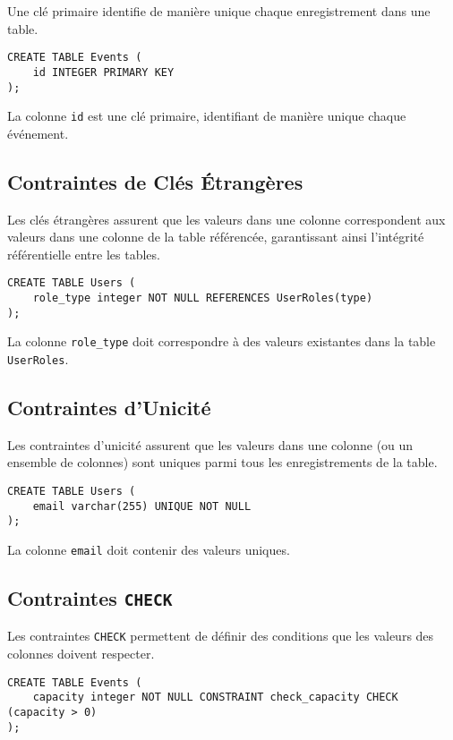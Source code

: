 Une clé primaire identifie de manière unique chaque enregistrement dans une table.

\begin{lstlisting}
CREATE TABLE Events (
    id INTEGER PRIMARY KEY
);
\end{lstlisting}

La colonne \texttt{id} est une clé primaire, identifiant de manière unique chaque événement.

\subsection*{Contraintes de Clés Étrangères}

Les clés étrangères assurent que les valeurs dans une colonne correspondent aux valeurs dans une colonne de la table référencée, garantissant ainsi l'intégrité référentielle entre les tables.

\begin{lstlisting}
CREATE TABLE Users (
    role_type integer NOT NULL REFERENCES UserRoles(type)
);
\end{lstlisting}

La colonne \texttt{role\_type} doit correspondre à des valeurs existantes dans la table \texttt{UserRoles}.

\subsection*{Contraintes d'Unicité}

Les contraintes d'unicité assurent que les valeurs dans une colonne (ou un ensemble de colonnes) sont uniques parmi tous les enregistrements de la table.

\begin{lstlisting}
CREATE TABLE Users (
    email varchar(255) UNIQUE NOT NULL
);
\end{lstlisting}

La colonne \texttt{email} doit contenir des valeurs uniques.

\subsection*{Contraintes \texttt{CHECK}}

Les contraintes \texttt{CHECK} permettent de définir des conditions que les valeurs des colonnes doivent respecter.

\begin{lstlisting}
CREATE TABLE Events (
    capacity integer NOT NULL CONSTRAINT check_capacity CHECK (capacity > 0)
);
\end{lstlisting}


